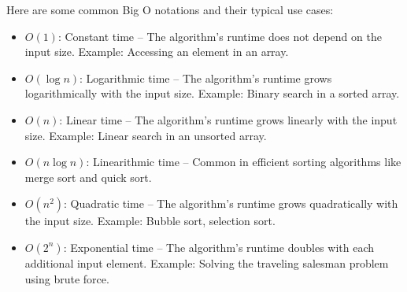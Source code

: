 \documentclass[12pt]{book} %
\begin{document}
Here are some common Big O notations and their typical use cases:
\begin{itemize}
    \item $O(1)$: Constant time – The algorithm's runtime does not depend on the input size. Example: Accessing an element in an array.
    \item $O(\log n)$: Logarithmic time – The algorithm's runtime grows logarithmically with the input size. Example: Binary search in a sorted array.
    \item $O(n)$: Linear time – The algorithm's runtime grows linearly with the input size. Example: Linear search in an unsorted array.
    \item $O(n \log n)$: Linearithmic time – Common in efficient sorting algorithms like merge sort and quick sort.
    \item $O(n^2)$: Quadratic time – The algorithm's runtime grows quadratically with the input size. Example: Bubble sort, selection sort.
    \item $O(2^n)$: Exponential time – The algorithm's runtime doubles with each additional input element. Example: Solving the traveling salesman problem using brute force.
\end{itemize}

\end{document}
